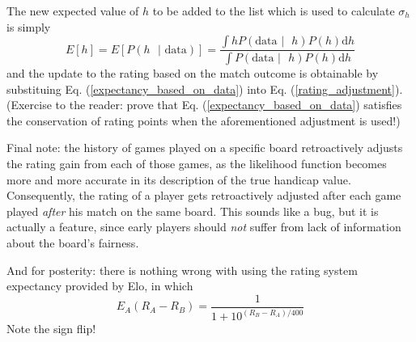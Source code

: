\documentclass[12pt]{article}
\begin{document}
	The new expected value of $h$ to be added to the list which is used to calculate $\sigma_h$ is simply
	\begin{equation}
	E[h] = E[P(h\text{ } | \text{ data})] = \frac{\int hP(\text{data } | \text{ }h)P(h) \text{d}h}{\int P(\text{data } | \text{ }h)P(h) \text{d}h}
	\end{equation}
	and the update to the rating based on the match outcome is obtainable by substituing Eq. (\ref{expectancy_based_on_data}) into Eq. (\ref{rating_adjustment}). (Exercise to the reader: prove that Eq. (\ref{expectancy_based_on_data}) satisfies the conservation of rating points when the aforementioned adjustment is used!)
	
	Final note: the history of games played on a specific board retroactively adjusts the rating gain from each of those games, as the likelihood function becomes more and more accurate in its description of the true handicap value. Consequently, the rating of a player gets retroactively adjusted after each game played \textit{after} his match on the same board. This sounds like a bug, but it is actually a feature, since early players should \textit{not} suffer from lack of information about the board's fairness.
	
	And for posterity: there is nothing wrong with using the rating system expectancy provided by Elo, in which
	$$E_A(R_A - R_B) = \frac{1}{1 + 10^{(R_B - R_A)/400}}$$
	Note the sign flip!
	

	
	
\end{document}
